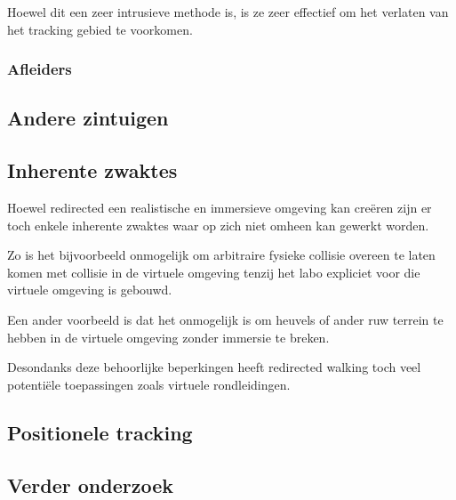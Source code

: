 \documentclass[a4paper,12pt]{article}
\begin{document}
Hoewel dit een zeer intrusieve methode is, is ze zeer effectief om het verlaten
van het tracking gebied te voorkomen.


\subsubsection{Afleiders}


\subsection{Andere zintuigen}


\subsection{Inherente zwaktes}
Hoewel redirected een realistische en immersieve omgeving kan cre\"eren zijn er
toch enkele inherente zwaktes waar op zich niet omheen kan gewerkt worden.

Zo is het bijvoorbeeld onmogelijk om arbitraire fysieke collisie overeen te laten
komen met collisie in de virtuele omgeving tenzij het labo expliciet voor die
virtuele omgeving is gebouwd.

Een ander voorbeeld is dat het onmogelijk is om heuvels of ander ruw terrein te
hebben in de virtuele omgeving zonder immersie te breken.

Desondanks deze behoorlijke beperkingen heeft redirected walking toch veel
potenti\"ele toepassingen zoals virtuele rondleidingen.


\subsection{Positionele tracking}


\subsection{Verder onderzoek}


\newpage


\end{document}
